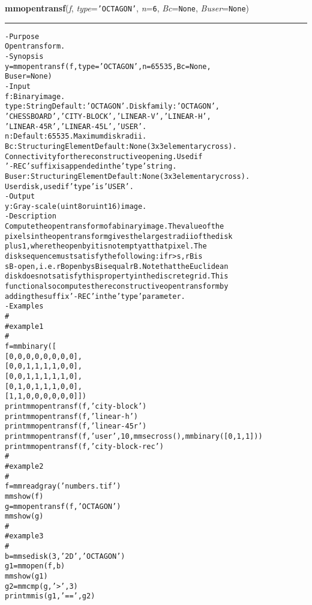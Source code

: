     \begin{boxedminipage}{\textwidth}

    \raggedright \textbf{mmopentransf}(\textit{f}, \textit{type}=\texttt{'\-O\-C\-T\-A\-G\-O\-N\-'\-}, \textit{n}=\texttt{6\-}, \textit{Bc}=\texttt{N\-o\-n\-e\-}, \textit{Buser}=\texttt{N\-o\-n\-e\-})

    \vspace{-1.5ex}

    \rule{\textwidth}{0.5\fboxrule}
\begin{alltt}
- Purpose
    Open transform.
- Synopsis
    y = mmopentransf(f, type='OCTAGON', n=65535, Bc=None,
    Buser=None)
- Input
    f:     Binary image.
    type:  String Default: 'OCTAGON'. Disk family: 'OCTAGON',
           'CHESSBOARD', 'CITY-BLOCK', 'LINEAR-V', 'LINEAR-H',
           'LINEAR-45R', 'LINEAR-45L', 'USER'.
    n:     Default: 65535. Maximum disk radii.
    Bc:    Structuring Element Default: None (3x3 elementary cross).
           Connectivity for the reconstructive opening. Used if
           '-REC' suffix is appended in the 'type' string.
    Buser: Structuring Element Default: None (3x3 elementary cross).
           User disk, used if 'type' is 'USER'.
- Output
    y: Gray-scale (uint8 or uint16) image.
- Description
    Compute the open transform of a binary image. The value of the
    pixels in the open transform gives the largest radii of the disk
    plus 1, where the open by it is not empty at that pixel. The
    disk sequence must satisfy the following: if r {\textgreater} s, rB is
    sB-open, i.e. rB open by sB is equal rB. Note that the Euclidean
    disk does not satisfy this property in the discrete grid. This
    function also computes the reconstructive open transform by
    adding the suffix '-REC' in the 'type' parameter.
- Examples
    \#
    \#   example 1
    \#
    f = mmbinary([
                  [0,0,0,0,0,0,0,0],
                  [0,0,1,1,1,1,0,0],
                  [0,0,1,1,1,1,1,0],
                  [0,1,0,1,1,1,0,0],
                  [1,1,0,0,0,0,0,0]])
    print mmopentransf( f, 'city-block')
    print mmopentransf( f, 'linear-h')
    print mmopentransf( f, 'linear-45r')
    print mmopentransf( f, 'user',10,mmsecross(),mmbinary([0,1,1]))
    print mmopentransf( f, 'city-block-rec')
    \#
    \#   example 2
    \#
    f=mmreadgray('numbers.tif')
    mmshow(f)
    g=mmopentransf(f,'OCTAGON')
    mmshow(g)
    \#
    \#   example 3
    \#
    b=mmsedisk(3,'2D','OCTAGON')
    g1=mmopen(f,b)
    mmshow(g1)
    g2=mmcmp(g,'{\textgreater}',3)
    print mmis(g1,'==',g2)\end{alltt}

    \vspace{1ex}

    \end{boxedminipage}

